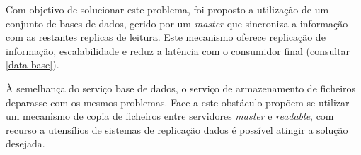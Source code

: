 Com objetivo de solucionar este problema, foi proposto a utilização de um conjunto de bases de dados, gerido por um \textit{master} que sincroniza a informação com as restantes replicas de leitura.
Este mecanismo oferece replicação de informação, escalabilidade e reduz a latência com o consumidor final (consultar \ref{data-base}).

À semelhança do serviço base de dados, o serviço de armazenamento de ficheiros deparasse com os mesmos problemas.
Face a este obstáculo propõem-se utilizar um mecanismo de copia de ficheiros entre servidores \textit{master} e \textit{readable}, com recurso a utensílios de sistemas de replicação dados é possível atingir a solução desejada.
